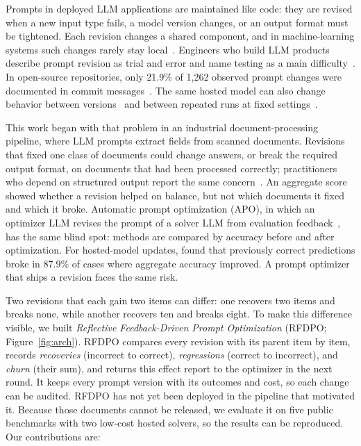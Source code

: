 \documentclass[11pt]{article}
\begin{document}
Prompts in deployed LLM applications are maintained like code: they are revised when a new input type fails, a model version changes, or an output format must be tightened. Each revision changes a shared component, and in machine-learning systems such changes rarely stay local~\citep{sculley2015debt}. Engineers who build LLM products describe prompt revision as trial and error and name testing as a main difficulty~\citep{parnin2023copilot}. In open-source repositories, only 21.9\% of 1,262 observed prompt changes were documented in commit messages~\citep{tafreshipour2025prompting}. The same hosted model can also change behavior between versions~\citep{chen2023drift} and between repeated runs at fixed settings~\citep{atil2025nondeterminism}.

This work began with that problem in an industrial document-processing pipeline, where LLM prompts extract fields from scanned documents. Revisions that fixed one class of documents could change answers, or break the required output format, on documents that had been processed correctly; practitioners who depend on structured output report the same concern~\citep{liu2024structured}. An aggregate score showed whether a revision helped on balance, but not which documents it fixed and which it broke. Automatic prompt optimization (APO), in which an optimizer LLM revises the prompt of a solver LLM from evaluation feedback~\citep{zhou2023ape,yang2024opro,pryzant2023protegi}, has the same blind spot: methods are compared by accuracy before and after optimization. For hosted-model updates, \citet{ma2024regression} found that previously correct predictions broke in 87.9\% of cases where aggregate accuracy improved. A prompt optimizer that ships a revision faces the same risk.

Two revisions that each gain two items can differ: one recovers two items and breaks none, while another recovers ten and breaks eight. To make this difference visible, we built \emph{Reflective Feedback-Driven Prompt Optimization} (RFDPO; Figure~\ref{fig:arch}). RFDPO compares every revision with its parent item by item, records \emph{recoveries} (incorrect to correct), \emph{regressions} (correct to incorrect), and \emph{churn} (their sum), and returns this effect report to the optimizer in the next round. It keeps every prompt version with its outcomes and cost, so each change can be audited. RFDPO has not yet been deployed in the pipeline that motivated it. Because those documents cannot be released, we evaluate it on five public benchmarks with two low-cost hosted solvers, so the results can be reproduced. Our contributions are:
\end{document}
